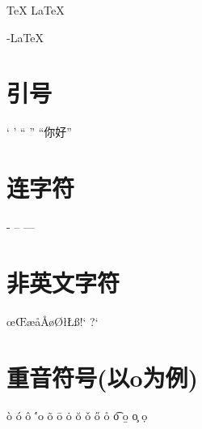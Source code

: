 \documentclass{article}
\begin{document}
	\TeX{} \LaTeX{} \LaTeXe{}
	\XeLaTeX{} %
	
	
	\AmSTeX{} \AmS-\LaTeX{} %
	\BibTeX{} \LuaTeX{}
	
	\METAFONT{} \MF{} \MP{}
	 
	\section{引号}
	
	` ' `` '' ``你好''
	
	\section{连字符}
	
	- -- ---
	
	\section{非英文字符}
	
	\oe \OE \ae \aa \AA \o \O \l \L \ss \SS !` ?`
	
	\section{重音符号(以o为例)}
	
	\`o \'o \^o \''o \~o \=o \.o \u{o} \v{o} \H{o} \r{o} \t{o} \b{o} \c{o} \d{o}	
\end{document}
